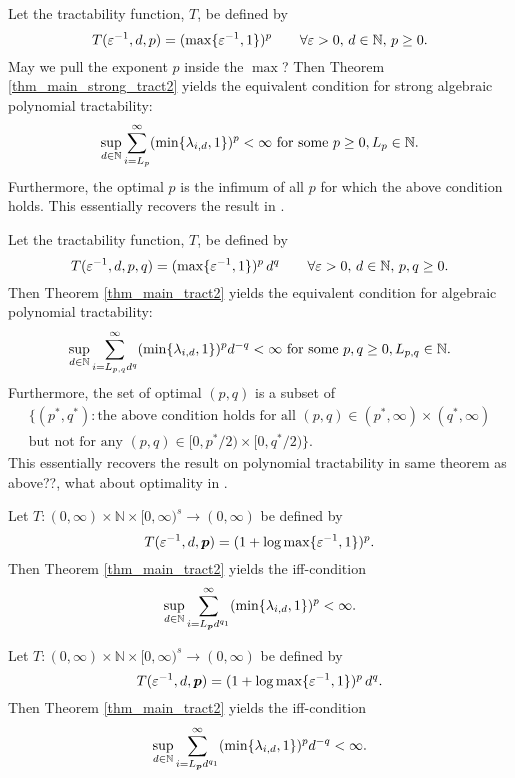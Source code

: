 \documentclass[11pt,a4paper]{article}
\newcommand{\fred}[1]{\begingroup\color{blue}#1\endgroup}
\newcommand{\kachi}[1]{\begingroup\color{ForestGreen}#1\endgroup}
\begin{document}
\begin{example}

Let the tractability function, $T$,
be defined by
\[
 T(\varepsilon^{-1},d,p)= (\max\{\varepsilon^{-1},1\})^p
 \qquad \forall \varepsilon > 0, \,  d \in \mathbb{N}, \, p \ge 0.
\]
\fred{May we pull the exponent $p$ inside the $\max$?} Then Theorem \ref{thm_main_strong_tract2} yields the  equivalent condition for strong algebraic polynomial tractability:
\[
 \sup_{d\in\mathbb{N}} \sum_{i=L_p}^\infty (\min\{\lambda_{i,d},1\})^p < \infty \text{ for some } p \ge 0, L_p \in \mathbb{N}.
\]
Furthermore, the optimal $p$ is the infimum of all $p$ for which the above condition holds.
This essentially recovers the result in \cite[Theorem 5.1]{NW08}.
\end{example}

\begin{example}
Let the tractability function, $T$,
be defined by
\[
 T(\varepsilon^{-1},d,p,q)= (\max\{\varepsilon^{-1},1\})^p\, d^q
 \qquad \forall \varepsilon > 0, \,  d \in \mathbb{N}, \, p,q \ge 0.
\]
Then Theorem \ref{thm_main_tract2} yields the  equivalent condition for algebraic polynomial tractability:
\[
 \sup_{d\in\mathbb{N}} \sum_{i=L_{p,q} d^{q}}^\infty (\min\{\lambda_{i,d},1\})^p d^{-q} < \infty \text{ for some } p,q \ge 0, L_{p,q} \in \mathbb{N}.
\]
Furthermore, the set of optimal $(p,q)$ is a subset of
\begin{multline*}
\{(p^*,q^*) : \text{the above condition holds for all }(p,q) \in (p^*,\infty) \times (q^*,\infty) \\
\text{but not for any }(p,q) \in [0,p^*/2) \times [0,q^*/2)\}.
\end{multline*}
This essentially recovers the result on polynomial tractability in \cite[Theorem 5.1]{NW08} \fred{same theorem as above??, what about optimality in \cite[Theorem 5.1]{NW08}}.
\end{example}


\kachi{\begin{example}
Let $ T :(0,\infty) \times \mathbb{N} \times [0,\infty)^s \rightarrow (0,\infty)$
be defined by
\[
 T(\varepsilon^{-1},d,\boldsymbol{p})= (1+\log\max\{\varepsilon^{-1},1\})^p.
\]
Then Theorem \ref{thm_main_tract2} yields the iff-condition
\[
 \sup_{d\in\mathbb{N}} \sum_{i=L_{\boldsymbol{p}} d^{q_1}}^\infty (\min\{\lambda_{i,d},1\})^p  < \infty.
\]
\end{example}
\begin{example}[EXP-polynomial tractability]

Let $ T :(0,\infty) \times \mathbb{N} \times [0,\infty)^s \rightarrow (0,\infty)$
be defined by
\[
 T(\varepsilon^{-1},d,\boldsymbol{p})= (1+\log \max\{\varepsilon^{-1},1\})^p\, d^q.
\]
Then Theorem \ref{thm_main_tract2} yields the iff-condition
\[
 \sup_{d\in\mathbb{N}} \sum_{i=L_{\boldsymbol{p}} d^{q_1}}^\infty (\min\{\lambda_{i,d},1\})^p d^{-q} < \infty.
\]
\end{example}}
\bigskip
\end{document}
